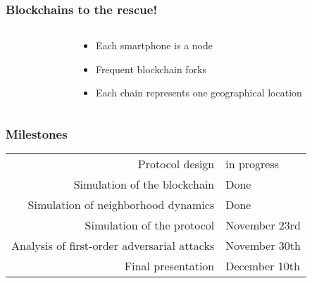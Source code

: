 \documentclass{beamer}
\begin{document}
\begin{frame}
	\frametitle{Blockchains to the rescue!}
	\begin{columns}
		\begin{column}{0.5\textwidth}
			\hfil
		\end{column}

		\begin{column}{0.5\textwidth}
			\begin{itemize}
				\item Each smartphone is a node
				\item Frequent blockchain forks
				\item Each chain represents one geographical location
			\end{itemize}
		\end{column}
	\end{columns}
\end{frame}

\begin{frame}
	\frametitle{Milestones}
	\begin{tabular}{r l}
		Protocol design & in progress \\
		Simulation of the blockchain & Done \\
		Simulation of neighborhood dynamics & Done \\
		Simulation of the protocol & November 23rd \\ %
		Analysis of first-order adversarial attacks & November 30th \\
		Final presentation & December 10th \\
	\end{tabular}
\end{frame}
\end{document}
